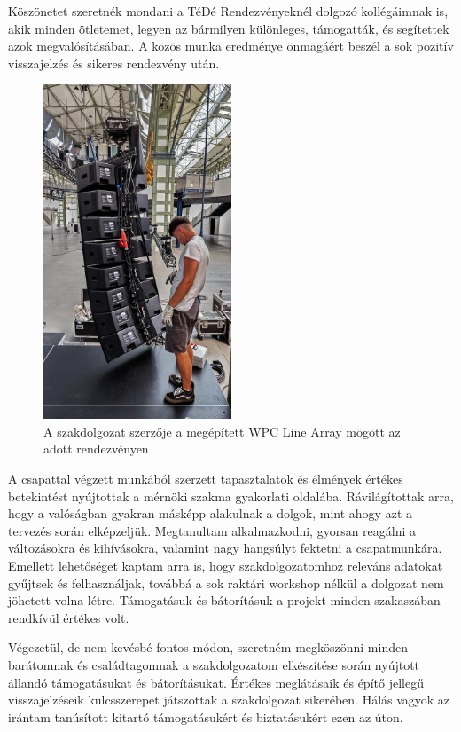 Köszönetet szeretnék mondani a TéDé Rendezvényeknél dolgozó kollégáimnak is, akik minden ötletemet, 
legyen az bármilyen különleges, támogatták, és segítettek azok megvalósításában. A közös munka eredménye önmagáért beszél
a sok pozitív visszajelzés és sikeres rendezvény után.
\begin {figure}[h!]
    \centering
    \includegraphics[width=0.5\textwidth]{figures/danci_wpc.jpg}
    \caption{A szakdolgozat szerzője a megépített WPC Line Array mögött az adott rendezvényen}
\end {figure}
A csapattal végzett munkából szerzett tapasztalatok és élmények értékes betekintést nyújtottak a mérnöki 
szakma gyakorlati oldalába. Rávilágítottak arra, hogy a valóságban gyakran másképp alakulnak a dolgok, mint ahogy azt a tervezés során elképzeljük. 
Megtanultam alkalmazkodni, gyorsan reagálni a változásokra és kihívásokra, valamint nagy hangsúlyt fektetni a csapatmunkára. 
Emellett lehetőséget kaptam arra is, hogy szakdolgozatomhoz releváns adatokat gyűjtsek és felhasználjak, 
továbbá a sok raktári workshop nélkül a dolgozat nem jöhetett volna létre. 
Támogatásuk és bátorításuk a projekt minden szakaszában rendkívül értékes volt.

Végezetül, de nem kevésbé fontos módon, szeretném megköszönni minden barátomnak és 
családtagomnak a szakdolgozatom elkészítése során nyújtott állandó támogatásukat és bátorításukat. 
Értékes meglátásaik és építő jellegű visszajelzéseik kulcsszerepet játszottak a szakdolgozat sikerében. 
Hálás vagyok az irántam tanúsított kitartó támogatásukért és biztatásukért ezen az úton.